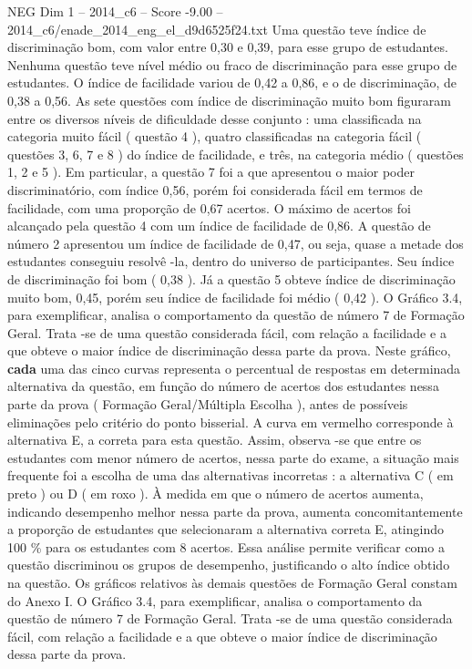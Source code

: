 \begin{textsample}{NEG Dim 1 – 2014\_c6 – Score -9.00 – 2014\_c6/enade\_2014\_eng\_el\_d9d6525f24.txt}
Uma questão teve índice de discriminação bom, com valor entre 0,30 e 0,39, para esse grupo de estudantes.
Nenhuma questão teve nível médio ou fraco de discriminação para esse grupo de estudantes.
O índice de facilidade variou de 0,42 a 0,86, e o de discriminação, de 0,38 a 0,56.
As sete questões com índice de discriminação muito bom figuraram entre os diversos níveis de dificuldade desse conjunto : uma classificada na categoria muito fácil ( questão 4 ), quatro classificadas na categoria fácil ( questões 3, 6, 7 e 8 ) do índice de facilidade, e três, na categoria médio ( questões 1, 2 e 5 ).
Em particular, a questão 7 foi a que apresentou o maior poder discriminatório, com índice 0,56, porém foi considerada fácil em termos de facilidade, com uma proporção de 0,67 acertos.
O máximo de acertos foi alcançado pela questão 4 com um índice de facilidade de 0,86.
A questão de número 2 apresentou um índice de facilidade de 0,47, ou seja, quase a metade dos estudantes conseguiu resolvê -la, dentro do universo de participantes.
Seu índice de discriminação foi bom ( 0,38 ).
Já a questão 5 obteve índice de discriminação muito bom, 0,45, porém seu índice de facilidade foi médio ( 0,42 ).
O Gráfico 3.4, para exemplificar, analisa o comportamento da questão de número 7 de Formação Geral.
Trata -se de uma questão considerada fácil, com relação a facilidade e a que obteve o maior índice de discriminação dessa parte da prova.
Neste gráfico, \textbf{cada} uma das cinco curvas representa o percentual de respostas em determinada alternativa da questão, em função do número de acertos dos estudantes nessa parte da prova ( Formação Geral/Múltipla Escolha ), antes de possíveis eliminações pelo critério do ponto bisserial.
A curva em vermelho corresponde à alternativa E, a correta para esta questão.
Assim, observa -se que entre os estudantes com menor número de acertos, nessa parte do exame, a situação mais frequente foi a escolha de uma das alternativas incorretas : a alternativa C ( em preto ) ou D ( em roxo ).
À medida em que o número de acertos aumenta, indicando desempenho melhor nessa parte da prova, aumenta concomitantemente a proporção de estudantes que selecionaram a alternativa correta E, atingindo 100 \% para os estudantes com 8 acertos.
Essa análise permite verificar como a questão discriminou os grupos de desempenho, justificando o alto índice obtido na questão.
Os gráficos relativos às demais questões de Formação Geral constam do Anexo I.
O Gráfico 3.4, para exemplificar, analisa o comportamento da questão de número 7 de Formação Geral.
Trata -se de uma questão considerada fácil, com relação a facilidade e a que obteve o maior índice de discriminação dessa parte da prova.

\end{textsample}
